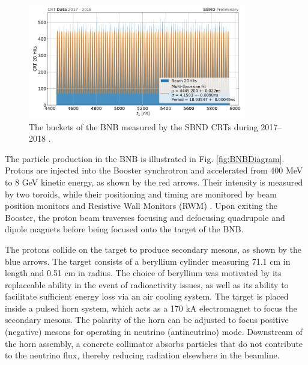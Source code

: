 \begin{figure}[ht!] 
\centering    
\includegraphics[width=0.85\textwidth]{CRT2017}
\caption[Booster Neutrino Beam Measured by SBND CRTs in 2017-2018]{
The buckets of the BNB measured by the SBND CRTs during 2017--2018 \cite{CPAD2022}.
}
\label{fig:CRT2017}
\end{figure}

The particle production in the BNB is illustrated in Fig. \ref{fig:BNBDiagram}.
Protons are injected into the Booster synchrotron and accelerated from 400 MeV to 8 GeV kinetic energy, as shown by the red arrows. 
Their intensity is measured by two toroids, while their positioning and timing are monitored by beam position monitors and Resistive Wall Monitors (RWM) \cite{BNBRWM}.
Upon exiting the Booster, the proton beam traverses focusing and defocusing quadrupole and dipole magnets before being focused onto the target of the BNB.

The protons collide on the target to produce secondary mesons, as shown by the blue arrows.
The target consists of a beryllium cylinder measuring 71.1 cm in length and 0.51 cm in radius.
The choice of beryllium was motivated by its replaceable ability in the event of radioactivity issues, as well as its ability to facilitate sufficient energy loss via an air cooling system.
The target is placed inside a pulsed horn system, which acts as a 170 kA electromagnet to focus the secondary mesons.
The polarity of the horn can be adjusted to focus positive (negative) mesons for operating in neutrino (antineutrino) mode. 
Downstream of the horn assembly, a concrete collimator absorbs particles that do not contribute to the neutrino flux, thereby reducing radiation elsewhere in the beamline.

